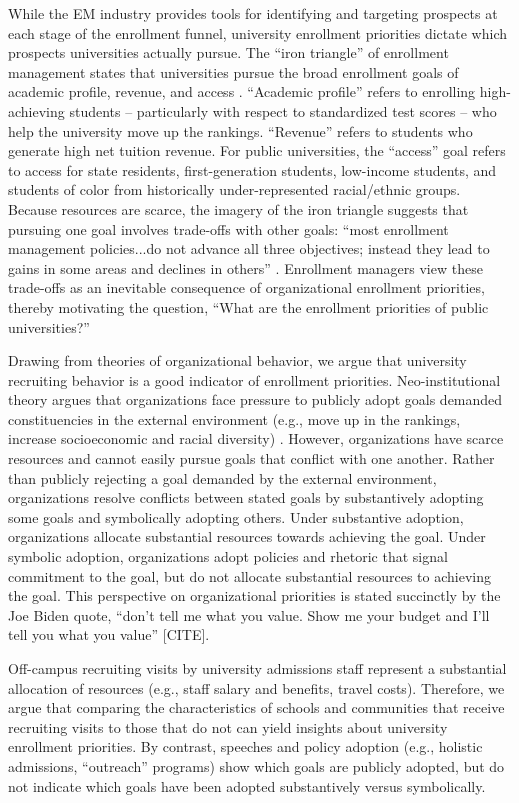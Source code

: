 \documentclass[twoside]{article}
\begin{document}
While the EM industry provides tools for identifying and targeting prospects at each stage of the enrollment funnel, university enrollment priorities dictate which prospects universities actually pursue.  The ``iron triangle'' of enrollment management states that universities pursue the broad enrollment goals of academic profile, revenue, and access \citep{RN2772}. ``Academic profile'' refers to enrolling high-achieving students -- particularly with respect to standardized test scores -- who help the university move up the rankings. ``Revenue'' refers to students who generate high net tuition revenue.  For public universities, the ``access'' goal refers to access for state residents, first-generation students, low-income students, and students of color from historically under-represented racial/ethnic groups. Because resources are scarce, the imagery of the iron triangle suggests that pursuing one goal involves trade-offs with other goals: ``most enrollment management policies...do not advance all three objectives; instead they lead to gains in some areas and declines in others'' \citep[p.~221]{RN2772}. Enrollment managers view these trade-offs as an inevitable consequence of organizational enrollment priorities, thereby motivating the question, ``What are the enrollment priorities of public universities?''

Drawing from theories of organizational behavior, we argue that university recruiting behavior is a good indicator of enrollment priorities.  Neo-institutional theory argues that organizations face pressure to publicly adopt goals demanded constituencies in the external environment (e.g., move up in the rankings, increase socioeconomic and racial diversity) \citep{RN513,RN527}. However, organizations have scarce resources and cannot easily pursue goals that conflict with one another.  Rather than publicly rejecting a goal demanded by the external environment, organizations resolve conflicts between stated goals by substantively adopting some goals and symbolically adopting others.  Under substantive adoption, organizations allocate substantial resources towards achieving the goal.  Under symbolic adoption, organizations adopt policies and rhetoric that signal commitment to the goal, but do not allocate substantial resources to achieving the goal.  This perspective on organizational priorities is stated succinctly by the Joe Biden quote, ``don’t tell me what you value. Show me your budget and I’ll tell you what you value'' [CITE].

Off-campus recruiting visits by university admissions staff represent a substantial allocation of resources (e.g., staff salary and benefits, travel costs).  Therefore, we argue that comparing the characteristics of schools and communities that receive recruiting visits to those that do not can yield insights about university enrollment priorities.  By contrast, speeches and policy adoption (e.g., holistic admissions, ``outreach'' programs) \citep[e.g., ][]{RN4017} show which goals are publicly adopted, but do not indicate which goals have been adopted substantively versus symbolically.
\end{document}
